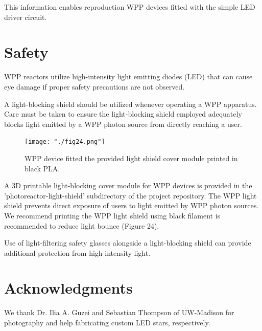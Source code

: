 \documentclass[11pt]{article}
\let\stdsection\section
\renewcommand\section{\clearpage\stdsection}
\begin{document}
This information enables reproduction WPP devices fitted with the simple LED driver circuit.

\section{Safety}

WPP reactors utilize high-intensity light emitting diodes (LED) that can cause eye damage if proper safety precautions are not observed.

A light-blocking shield should be utilized whenever operating a WPP apparatus. 
Care must be taken to ensure the light-blocking shield employed adequately blocks light emitted by a WPP photon source from directly reaching a user.

\begin{figure}[H]
	\centering
	\texttt{[image: "./fig24.png"]}
	\caption{WPP device fitted the provided light shield cover module printed in black PLA.}
\end{figure}

A 3D printable light-blocking cover module for WPP devices is provided in the 'photoreactor-light-shield' subdirectory of the project repository.
The WPP light shield prevents direct exposure of users to light emitted by WPP photon sources. 
We recommend printing the WPP light shield using black filament is recommended to reduce light bounce (Figure 24).

Use of light-filtering safety glasses alongside a light-blocking shield can provide additional protection from high-intensity light.

\section{Acknowledgments}

We thank Dr. Ilia A. Guzei and Sebastian Thompson of UW-Madison for photography and help fabricating custom LED stars, respectively. 
\end{document}
